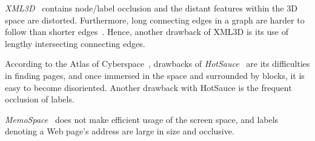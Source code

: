 \documentclass[]{article}
\begin{document}
{%
{\em XML3D}~\cite{rcmc-00} contains node/label occlusion and the distant features within the 3D space are distorted.
Furthermore, long connecting edges in a graph are harder to follow than shorter edges~\cite{dett-gd-99}.
Hence, another drawback of XML3D is its use of lengthy intersecting connecting edges.

According to the Atlas of Cyberspace~\cite{atlas}, drawbacks of {\em HotSauce}~\cite{g02} are its difficulties in finding pages, and once immersed in the space and surrounded by blocks, it is easy to become disoriented.
Another drawback with HotSauce is the frequent occlusion of labels.


{\em MemoSpace}~\cite{wls05}  does not make efficient usage of the screen space, and labels denoting a Web page's address are large in size and occlusive.

}
\end{document}
